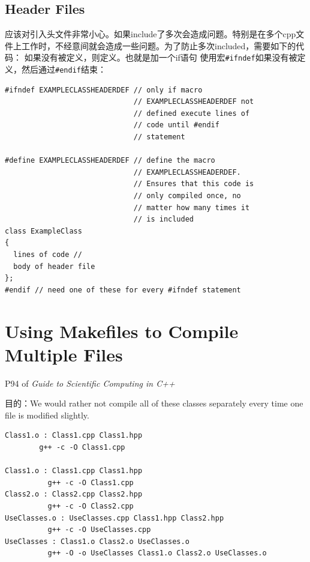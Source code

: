 \documentclass[
]{book}
\theoremstyle{definition}
\theoremstyle{definition}
\theoremstyle{definition}
\theoremstyle{remark}
\begin{document}
\hypertarget{header-files}{%
\subsection{Header Files}\label{header-files}}

应该对引入头文件非常小心。如果include了多次会造成问题。特别是在多个cpp文件上工作时，不经意间就会造成一些问题。为了防止多次included，需要如下的代码：
如果没有被定义，则定义。也就是加一个if语句
使用宏\texttt{\#ifndef}如果没有被定义，然后通过\texttt{\#endif}结束：

\begin{verbatim}
#ifndef EXAMPLECLASSHEADERDEF // only if macro
                              // EXAMPLECLASSHEADERDEF not
                              // defined execute lines of 
                              // code until #endif 
                              // statement

#define EXAMPLECLASSHEADERDEF // define the macro 
                              // EXAMPLECLASSHEADERDEF.
                              // Ensures that this code is 
                              // only compiled once, no 
                              // matter how many times it 
                              // is included 
class ExampleClass 
{ 
  lines of code // 
  body of header file 
};
#endif // need one of these for every #ifndef statement
\end{verbatim}

\hypertarget{using-makefiles-to-compile-multiple-files}{%
\section{Using Makefiles to Compile Multiple Files}\label{using-makefiles-to-compile-multiple-files}}

P94 of \emph{Guide to Scientific Computing in C++}

目的：We would rather not compile all of these classes separately every time one file is modified slightly.

\begin{verbatim}
Class1.o : Class1.cpp Class1.hpp
        g++ -c -O Class1.cpp

Class1.o : Class1.cpp Class1.hpp 
          g++ -c -O Class1.cpp 
Class2.o : Class2.cpp Class2.hpp
          g++ -c -O Class2.cpp 
UseClasses.o : UseClasses.cpp Class1.hpp Class2.hpp
          g++ -c -O UseClasses.cpp 
UseClasses : Class1.o Class2.o UseClasses.o
          g++ -O -o UseClasses Class1.o Class2.o UseClasses.o
\end{verbatim}
\end{document}
